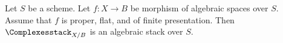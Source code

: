 %
\begin{theorem}
\label{theorem-complexes-algebraic}
\begin{reference}
\cite{lieblich-complexes}
\end{reference}
Let $S$ be a scheme. Let $f : X \to B$ be morphism of algebraic spaces
over $S$. Assume that $f$ is proper, flat, and of finite presentation.
Then $\Complexesstack_{X/B}$ is an algebraic stack over $S$.
\end{theorem}

